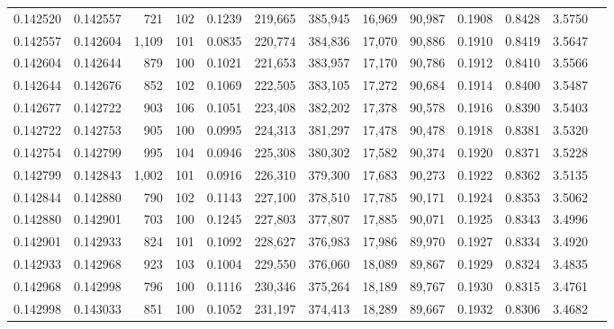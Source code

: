 \begin{tabular}{rrrrrrrrrrrrr}
0.142520 & 0.142557 &   721 & 102 &                                     0.1239 & 219,665 & 385,945 &  16,969 &  90,987 & 0.1908 & 0.8428 & 3.5750 \\
0.142557 & 0.142604 & 1,109 & 101 &                                     0.0835 & 220,774 & 384,836 &  17,070 &  90,886 & 0.1910 & 0.8419 & 3.5647 \\
0.142604 & 0.142644 &   879 & 100 &                                     0.1021 & 221,653 & 383,957 &  17,170 &  90,786 & 0.1912 & 0.8410 & 3.5566 \\
0.142644 & 0.142676 &   852 & 102 &                                     0.1069 & 222,505 & 383,105 &  17,272 &  90,684 & 0.1914 & 0.8400 & 3.5487 \\
0.142677 & 0.142722 &   903 & 106 &                                     0.1051 & 223,408 & 382,202 &  17,378 &  90,578 & 0.1916 & 0.8390 & 3.5403 \\
0.142722 & 0.142753 &   905 & 100 &                                     0.0995 & 224,313 & 381,297 &  17,478 &  90,478 & 0.1918 & 0.8381 & 3.5320 \\
0.142754 & 0.142799 &   995 & 104 &                                     0.0946 & 225,308 & 380,302 &  17,582 &  90,374 & 0.1920 & 0.8371 & 3.5228 \\
0.142799 & 0.142843 & 1,002 & 101 &                                     0.0916 & 226,310 & 379,300 &  17,683 &  90,273 & 0.1922 & 0.8362 & 3.5135 \\
0.142844 & 0.142880 &   790 & 102 &                                     0.1143 & 227,100 & 378,510 &  17,785 &  90,171 & 0.1924 & 0.8353 & 3.5062 \\
0.142880 & 0.142901 &   703 & 100 &                                     0.1245 & 227,803 & 377,807 &  17,885 &  90,071 & 0.1925 & 0.8343 & 3.4996 \\
0.142901 & 0.142933 &   824 & 101 &                                     0.1092 & 228,627 & 376,983 &  17,986 &  89,970 & 0.1927 & 0.8334 & 3.4920 \\
0.142933 & 0.142968 &   923 & 103 &                                     0.1004 & 229,550 & 376,060 &  18,089 &  89,867 & 0.1929 & 0.8324 & 3.4835 \\
0.142968 & 0.142998 &   796 & 100 &                                     0.1116 & 230,346 & 375,264 &  18,189 &  89,767 & 0.1930 & 0.8315 & 3.4761 \\
0.142998 & 0.143033 &   851 & 100 &                                     0.1052 & 231,197 & 374,413 &  18,289 &  89,667 & 0.1932 & 0.8306 & 3.4682 \\

\end{tabular}

